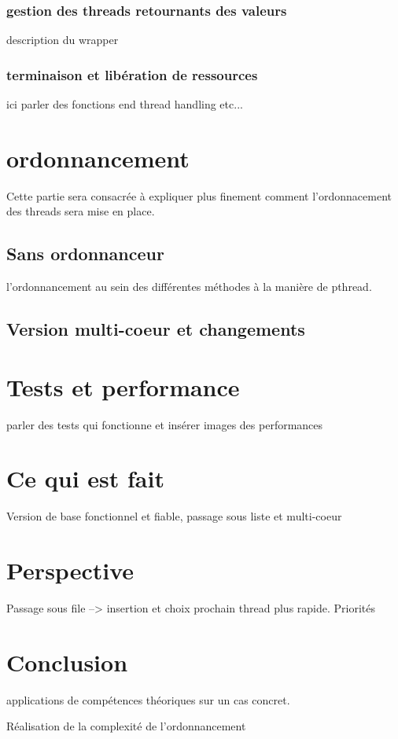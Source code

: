 \documentclass{article}
\begin{document}
			\subsubsection{gestion des threads retournants des valeurs}
			description du wrapper
			
			\subsubsection{terminaison et libération de ressources}
			ici parler des fonctions end thread handling etc...
		

	\section{ordonnancement}
	Cette partie sera consacrée à expliquer plus finement comment l'ordonnacement des threads sera mise en place.

		\subsection{Sans ordonnanceur}
		l'ordonnancement au sein des différentes méthodes à la manière de pthread.

		\subsection{Version multi-coeur et changements}

	\section{Tests et performance}
	parler des tests qui fonctionne et insérer images des performances %

	\section{Ce qui est fait}
	Version de base fonctionnel et fiable, passage sous liste et multi-coeur

	\section{Perspective}
	Passage sous file --> insertion et choix prochain thread plus rapide.
	Priorités

	\section{Conclusion}
	applications de compétences théoriques sur un cas concret.
	
	Réalisation de la complexité de l'ordonnancement
\end{document}
